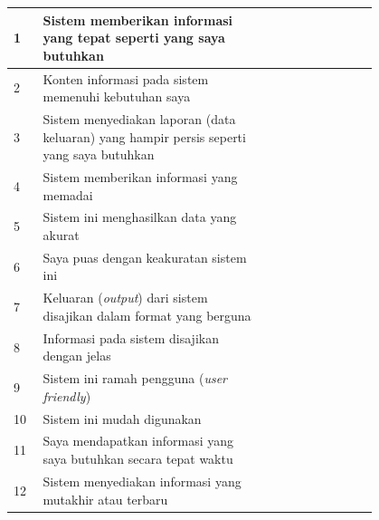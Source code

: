 \begin{longtable}{|p{0.05\linewidth}|p{0.5\linewidth}|p{0.05\linewidth}|p{0.05\linewidth}|p{0.05\linewidth}|p{0.05\linewidth}|p{0.05\linewidth}|}
      1           & Sistem memberikan informasi yang tepat seperti yang saya butuhkan                        &                                         &             &            &            &             \\
      \hline
      2           & Konten informasi pada sistem memenuhi kebutuhan saya                                     &                                         &             &            &            &             \\
      \hline
      3           & Sistem menyediakan laporan (data keluaran) yang hampir persis seperti yang saya butuhkan &                                         &             &            &            &             \\
      \hline
      4           & Sistem memberikan informasi yang memadai                                                 &                                         &             &            &            &             \\
      \hline
      5           & Sistem ini menghasilkan data yang akurat                                                 &                                         &             &            &            &             \\
      \hline
      6           & Saya puas dengan keakuratan sistem ini                                                   &                                         &             &            &            &             \\
      \hline
      7           & Keluaran (\textit{output}) dari sistem disajikan dalam format yang berguna               &                                         &             &            &            &             \\
      \hline
      8           & Informasi pada sistem disajikan dengan jelas                                             &                                         &             &            &            &             \\
      \hline
      9           & Sistem ini ramah pengguna (\textit{user friendly})                                       &                                         &             &            &            &             \\
      \hline
      10          & Sistem ini mudah digunakan                                                               &                                         &             &            &            &             \\
      \hline
      11          & Saya mendapatkan informasi yang saya butuhkan secara tepat waktu                         &                                         &             &            &            &             \\
      \hline
      12          & Sistem menyediakan informasi yang mutakhir atau terbaru                                  &                                         &             &            &            &             \\
      \hline
\end{longtable}

